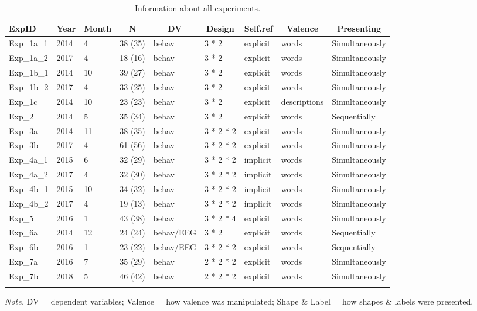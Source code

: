 \documentclass[man]{apa6}
\begin{document}
\begin{table}[tbp]
\begin{center}
\begin{threeparttable}
\caption{\label{tab:Table1_exp_info}Information about all experiments.}
\begin{tabular}{lllllllll}
\toprule
ExpID & \multicolumn{1}{c}{Year} & \multicolumn{1}{c}{Month} & \multicolumn{1}{c}{N} & \multicolumn{1}{c}{DV} & \multicolumn{1}{c}{Design} & \multicolumn{1}{c}{Self.ref} & \multicolumn{1}{c}{Valence} & \multicolumn{1}{c}{Presenting}\\
\midrule
Exp\_1a\_1 & 2014 & 4 & 38 (35) & behav & 3 * 2 & explicit & words & Simultaneously\\
Exp\_1a\_2 & 2017 & 4 & 18 (16) & behav & 3 * 2 & explicit & words & Simultaneously\\
Exp\_1b\_1 & 2014 & 10 & 39 (27) & behav & 3 * 2 & explicit & words & Simultaneously\\
Exp\_1b\_2 & 2017 & 4 & 33 (25) & behav & 3 * 2 & explicit & words & Simultaneously\\
Exp\_1c & 2014 & 10 & 23 (23) & behav & 3 * 2 & explicit & descriptions & Simultaneously\\
Exp\_2 & 2014 & 5 & 35 (34) & behav & 3 * 2 & explicit & words & Sequentially\\
Exp\_3a & 2014 & 11 & 38 (35) & behav & 3 * 2 * 2 & explicit & words & Simultaneously\\
Exp\_3b & 2017 & 4 & 61 (56) & behav & 3 * 2 * 2 & explicit & words & Simultaneously\\
Exp\_4a\_1 & 2015 & 6 & 32 (29) & behav & 3 * 2 * 2 & implicit & words & Simultaneously\\
Exp\_4a\_2 & 2017 & 4 & 32 (30) & behav & 3 * 2 * 2 & implicit & words & Simultaneously\\
Exp\_4b\_1 & 2015 & 10 & 34 (32) & behav & 3 * 2 * 2 & implicit & words & Simultaneously\\
Exp\_4b\_2 & 2017 & 4 & 19 (13) & behav & 3 * 2 * 2 & implicit & words & Simultaneously\\
Exp\_5 & 2016 & 1 & 43 (38) & behav & 3 * 2 * 4 & explicit & words & Simultaneously\\
Exp\_6a & 2014 & 12 & 24 (24) & behav/EEG & 3 * 2 & explicit & words & Sequentially\\
Exp\_6b & 2016 & 1 & 23 (22) & behav/EEG & 3 * 2 * 2 & explicit & words & Sequentially\\
Exp\_7a & 2016 & 7 & 35 (29) & behav & 2 * 2 * 2 & explicit & words & Simultaneously\\
Exp\_7b & 2018 & 5 & 46 (42) & behav & 2 * 2 * 2 & explicit & words & Simultaneously\\
\bottomrule
\addlinespace
\end{tabular}
\begin{tablenotes}[para]
\normalsize{\textit{Note.} DV = dependent variables; Valence = how valence was manipulated; Shape \& Label = how shapes \& labels were presented.}
\end{tablenotes}
\end{threeparttable}
\end{center}
\end{table}
\end{document}
